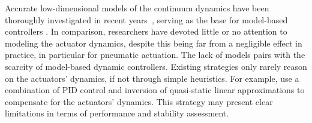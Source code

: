 Accurate low-dimensional models of the continuum dynamics have been thoroughly investigated in recent years~\cite{faure2012sofa, grazioso2018geometrically, sadati2019TMTDyn}, serving as the base for model-based controllers \cite{boyer2020dynamics, della2023model}. 
In comparison, researchers have devoted little or no attention to modeling the actuator dynamics, despite this being far from a negligible effect in practice, in particular for pneumatic actuation. %
%
%
%
The lack of models pairs with the scarcity of model-based dynamic controllers. Existing strategies only rarely reason on the actuators' dynamics, if not through simple heuristics.
%
For example, \cite{marchese2016design, della2020model} use a combination of PID control and inversion of quasi-static linear approximations to compensate for the actuators' dynamics. %
%
This strategy may present clear limitations in terms of performance and stability assessment.
%

